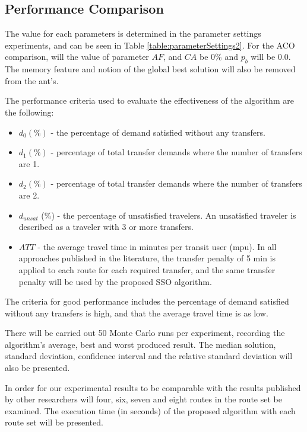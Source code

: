 \subsection{Performance Comparison}
\label{subsec:performanceComparison_setup}

The value for each parameters is determined in the parameter settings experiments, and can be seen in Table \vref{table:parameterSettings2}. For the ACO comparison, will the value of parameter $AF$, and $CA$ be 0\% and $p_b$ will be 0.0. The memory feature and notion of the global best solution will also be removed from the ant's.

The performance criteria used to evaluate the effectiveness of the algorithm are the following:
\begin{itemize}
\item $d_0 (\%)$ - the percentage of demand satisfied without any transfers. 
\item $d_1 (\%)$ - percentage of total transfer demands where the number of transfers are 1. 
\item $d_2 (\%)$ - percentage of total transfer demands where the number of transfers are 2. 
\item $d_{unsat}$ (\%) - the percentage of unsatisfied travelers. An unsatisfied traveler is described as a traveler with 3 or more transfers. 
\item $ATT$  - the average travel time in minutes per transit user (mpu). In all approaches published in the literature, the transfer penalty of 5 min is applied to each route for each required transfer, and the same transfer penalty will be used by the proposed SSO algorithm.
\end{itemize}
The criteria for good performance includes the percentage of demand satisfied without any transfers is high, and that the average travel time is as low.

There will be carried out 50 Monte Carlo runs per experiment, recording the algorithm's average, best and worst produced result. The median solution, standard deviation, confidence interval and the relative standard deviation will also be presented. 

In order for our experimental results to be comparable with the results published by other researchers will four, six, seven and eight routes in the route set be examined. The execution time (in seconds) of the proposed algorithm with each route set will be presented.

